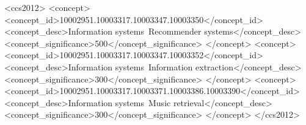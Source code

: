\documentclass[sigconf]{acmart}
\begin{document}
%
%
\begin{CCSXML}
<ccs2012>
<concept>
<concept_id>10002951.10003317.10003347.10003350</concept_id>
<concept_desc>Information systems~Recommender systems</concept_desc>
<concept_significance>500</concept_significance>
</concept>
<concept>
<concept_id>10002951.10003317.10003347.10003352</concept_id>
<concept_desc>Information systems~Information extraction</concept_desc>
<concept_significance>300</concept_significance>
</concept>
<concept>
<concept_id>10002951.10003317.10003371.10003386.10003390</concept_id>
<concept_desc>Information systems~Music retrieval</concept_desc>
<concept_significance>300</concept_significance>
</concept>
</ccs2012>
\end{CCSXML}




\maketitle




\end{document}
